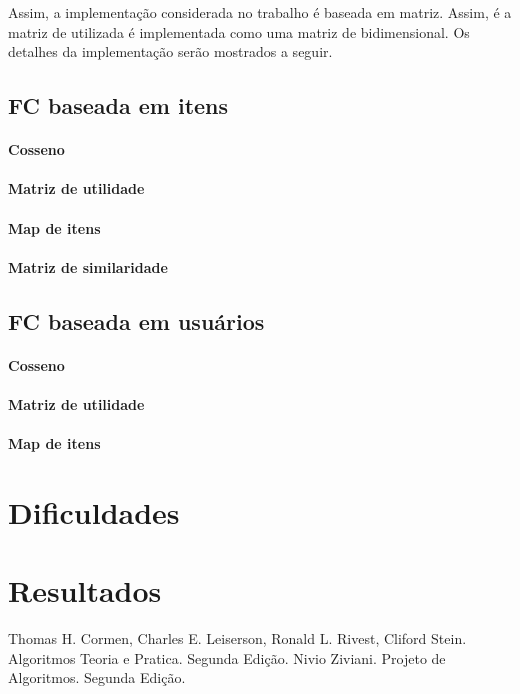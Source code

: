 \documentclass[brazil,a4paper,11pt]{article}
\begin{document}
Assim, a implementação considerada no trabalho é baseada em matriz. Assim, é a matriz de utilizada é implementada como uma matriz de bidimensional. Os detalhes da implementação serão mostrados a seguir.


\subsection{FC baseada em itens}

\paragraph{Cosseno} 

\paragraph{Matriz de utilidade}

\paragraph{Map de itens}

\paragraph{Matriz de similaridade}


\subsection{FC baseada em usuários}

\paragraph{Cosseno} 

\paragraph{Matriz de utilidade}

\paragraph{Map de itens}

\section{Dificuldades}

\section{Resultados}


\small
\begin{thebibliography}{}
Thomas H. Cormen, Charles E. Leiserson, Ronald L. Rivest, Cliford Stein. Algoritmos Teoria e Pratica. Segunda Edição.
Nivio Ziviani. Projeto de Algoritmos. Segunda Edição.
\end{thebibliography}

%
%
\end{document}
